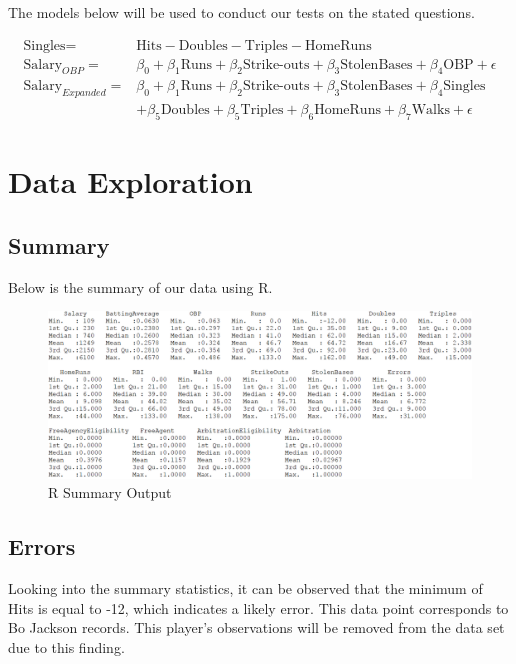 \documentclass[a4paper, 11pt]{article}
\begin{document}
The models below will be used to conduct our tests on the stated questions.
\vspace{-1cm}
\begin{center}
	\begin{align*}
		\text{Singles}=           & \text{Hits}-\text{Doubles}-\text{Triples}-\text{HomeRuns}                                                           \\
		\text{Salary}_{OBP}=      & \beta_0 + \beta_1\text{Runs} + \beta_2\text{Strike-outs} + \beta_3\text{StolenBases} + \beta_4\text{OBP} + \epsilon \\
		\text{Salary}_{Expanded}= & \beta_0 + \beta_1\text{Runs} + \beta_2\text{Strike-outs} + \beta_3\text{StolenBases} + \beta_4\text{Singles}        \\
		                          & + \beta_5\text{Doubles} + \beta_5\text{Triples} + \beta_6\text{HomeRuns} + \beta_7\text{Walks} + \epsilon           
	\end{align*}
\end{center}

\section*{Data Exploration}

\subsection*{Summary}
Below is the summary of our data using R.
\vspace{-1em}
\begin{figure}[H]
	\centering
	\caption{R Summary Output}
	\includegraphics[width=\textwidth]{summary.png}
\end{figure}

\subsection*{Errors}
Looking into the summary statistics, it can be observed that the minimum of Hits is equal to -12, which indicates a likely error. This data point corresponds to Bo Jackson records. This player's observations will be removed from the data set due to this finding.
\end{document}
